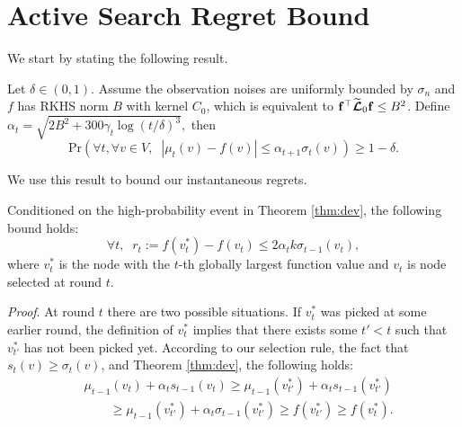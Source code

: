 
\section{Active Search Regret Bound}
\label{appendix:proof_as_regret}
We start by stating the following result.%
\begin{theorem}
	\label{thm:dev}
	Let $\delta \in (0,1)$. Assume the observation noises are uniformly bounded by $\sigma_n$ and $f$ has RKHS norm $B$ with kernel $C_0$, which is equivalent to $\mathbf{f}^\top\widetilde{{\boldsymbol{\mathcal L}}}_0\mathbf{f}\leq B^2$. Define 
	$
		\alpha_t = \sqrt{2 B^2 + 300 \gamma_t \log(t/\delta)^3},
		$
	then
	\begin{equation*}
		\mbox{Pr}\left(\forall t, \forall v \in V, \;\; |\mu_t(v) - f(v)| \leq \alpha_{t+1} \sigma_t(v) \right) \geq 1 - \delta.
	\end{equation*}
\end{theorem}
We use this result to bound our instantaneous regrets.
\begin{lemma}
	Conditioned on the high-probability event in Theorem \ref{thm:dev}, the following bound holds:
	\begin{equation*}
		\forall t, \;\; r_t := f(v^*_t) - f(v_t) \leq 2 \alpha_t k \sigma_{t-1}(v_t), 
	\end{equation*}
	where $v^*_t$ is the node with the $t$-th globally largest function value and $v_t$ is node selected at round $t$. 
\end{lemma}
\emph{Proof}.
At round $t$ there are two possible situations. If 
$v^*_t$ was picked at some earlier round, the definition of $v^*_t$ implies that there exists some $t' < t$ such that $v^*_{t'}$ 
has not been picked yet. According to our selection rule, the fact that $s_t(v) \geq \sigma_t(v)$, 
and Theorem \ref{thm:dev}, the following holds:
\begin{align*}
	&\mu_{t-1}(v_t) + \alpha_t s_{t-1}(v_t) \geq \mu_{t-1}(v^*_{t'}) + \alpha_t s_{t-1}(v^*_{t'}) \\
		&\qquad \geq \mu_{t-1}(v^*_{t'}) + \alpha_t \sigma_{t-1}(v^*_{t'})
	 \geq f(v^*_{t'}) \geq f(v^*_t).
\end{align*}
